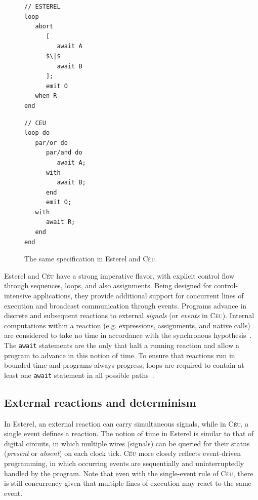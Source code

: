 \documentclass{acm_proc_article-sp}
\newcommand{\CEU}{\textsc{C\'{e}u}\xspace}
\newcommand{\code}[1] {{\small{\texttt{#1}}}}
\newcommand{\1}{\;}
\newcommand{\2}{\;\;}
\newcommand{\3}{\;\;\;}
\newcommand{\5}{\;\;\;\;\;}
\begin{document}
\begin{figure}[t]
\begin{minipage}[t]{0.49\linewidth}
\begin{lstlisting}[mathescape=true]
// ESTEREL
loop
   abort
      [
         await A
      $\|$
         await B
      ];
      emit O
   when R
end
\end{lstlisting}
\end{minipage}
%
\begin{minipage}[t]{0.49\linewidth}
\begin{lstlisting}
// CEU
loop do
   par/or do
      par/and do
         await A;
      with
         await B;
      end
      emit O;
   with
      await R;
   end
end
\end{lstlisting}
\end{minipage}
\caption{ The same specification in Esterel and \CEU. %
{\small
}
\label{lst.abro}
}
\end{figure}

Esterel and \CEU have a strong imperative flavor, with explicit control flow 
through sequences, loops, and also assignments.
Being designed for control-intensive applications, they provide additional 
support for concurrent lines of execution and broadcast communication through 
events.
%
Programs advance in discrete and subsequent reactions to external 
\emph{signals} (or \emph{events} in \CEU).
Internal computations within a reaction (e.g. expressions, assignments, and 
native calls) are considered to take no time in accordance with the synchronous 
hypothesis~\cite{rp.hypothesis}.
The \code{await} statements are the only that halt a running reaction and allow 
a program to advance in this notion of time.
%
To ensure that reactions run in bounded time and programs always progress, 
loops are required to contain at least one \code{await} statement in all 
possible paths~\cite{ceu.sensys,esterel.primer}.

\subsection{External reactions and determinism}

In Esterel, an external reaction can carry simultaneous signals, while in \CEU, 
a single event defines a reaction.
%
The notion of time in Esterel is similar to that of digital circuits, in which 
multiple wires (signals) can be queried for their status (\emph{present} or 
\emph{absent}) on each clock tick.
%
\CEU more closely reflects event-driven programming, in which occurring events 
are sequentially and uninterruptedly handled by the program.
%
Note that even with the single-event rule of \CEU, there is still concurrency 
given that multiple lines of execution may react to the same event.
\end{document}
